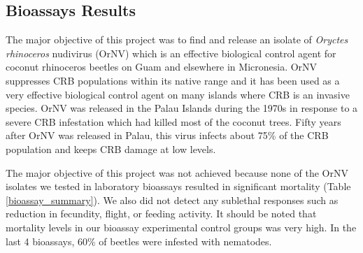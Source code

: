 \documentclass[12pt,letterpaper,english,bibliography=totocnumbered, abstract=on]{scrartcl}
\begin{document}
\subsection{Bioassays Results}

The major objective of this project was to find and release an isolate of \textit{Oryctes rhinoceros} nudivirus (OrNV) which is an effective biological control agent for coconut rhinoceros beetles on Guam and elsewhere in Micronesia. OrNV suppresses CRB populations within its native range and it has been used as a very effective biological control agent on many islands where CRB is an invasive species. OrNV was released in the Palau Islands during the 1970s in response to a severe CRB infestation which had killed most of the coconut trees. Fifty years after OrNV was released in Palau, this virus infects about 75\% of the CRB population \cite{tanakaConfirmationOryctesRhinoceros2021a} and keeps CRB damage at low levels.  

The major objective of this project was not achieved because none of the OrNV isolates we tested in laboratory bioassays resulted in significant mortality (Table \ref{bioassay_summary}). We also did not detect any sublethal responses such as reduction in fecundity, flight, or feeding activity.  It should be noted that mortality levels in our bioassay experimental control groups was very high. In the last 4 bioassays, 60\% of beetles were infested with nematodes.   
\end{document}
